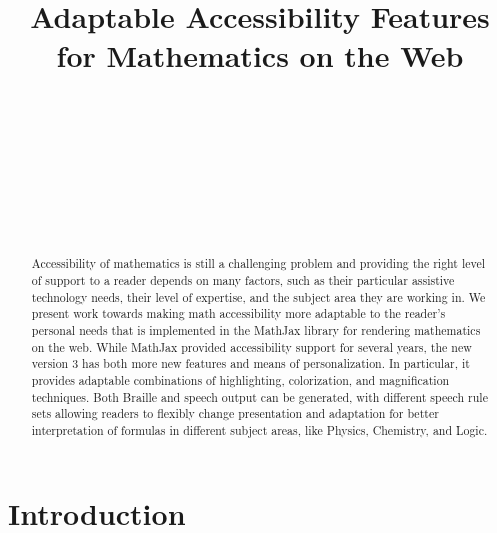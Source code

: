 \documentclass{sig-alternate}
\begin{document}


\title{Adaptable Accessibility Features for Mathematics on the Web}
  

\author{
  \\
  \\
  \\
  \\
  \\
  \\
  \\
}

\maketitle

\begin{abstract}
  Accessibility of mathematics is still a challenging problem and providing the
  right level of support to a reader depends on many factors, such as their
  particular assistive technology needs, their level of expertise, and the
  subject area they are working in. We present work towards making math
  accessibility more adaptable to the reader's personal needs that is
  implemented in the MathJax library for rendering mathematics on the web. While
  MathJax provided accessibility support for several years, the new version 3
  has both more new features and means of personalization. In particular, it
  provides adaptable combinations of highlighting, colorization, and
  magnification techniques. Both Braille and speech output can be generated,
  with different speech rule sets allowing readers to flexibly change
  presentation and adaptation for better interpretation of formulas in
  different subject areas, like Physics, Chemistry, and Logic.
\end{abstract}



\section{Introduction}
\end{document}
